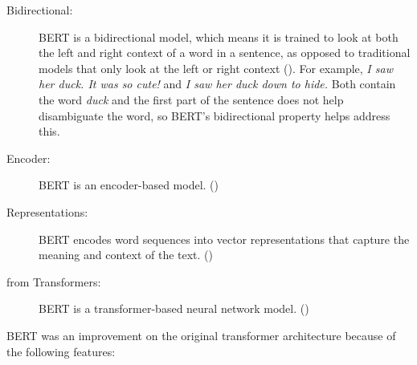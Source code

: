 \begin{description}
   \item[Bidirectional:] BERT is a bidirectional model, which means it is trained to look at both the left and right context of a word in a sentence, as opposed to traditional models that only look at the left or right context (\cite{devlin_bert_2019}). For example, \textit{I saw her duck. It was so cute!} and \textit{I saw her duck down to hide.} Both contain the word \textit{duck} and the first part of the sentence does not help disambiguate the word, so BERT's bidirectional property helps address this.
   \item[Encoder:] BERT is an encoder-based model. (\cite{devlin_bert_2019})
   \item[Representations:] BERT encodes word sequences into vector representations that capture the meaning and context of the text. (\cite{devlin_bert_2019})
   \item[from Transformers:] BERT is a transformer-based neural network model. (\cite{devlin_bert_2019})
\end{description}

BERT was an improvement on the original transformer architecture because of the following features:

